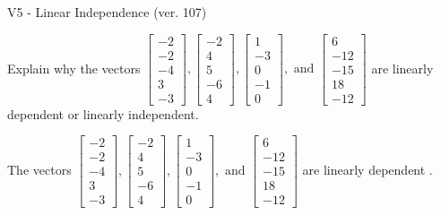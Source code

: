 \begin{exercise}
  \begin{exerciseTitle}V5 - Linear Independence (ver. 107)\end{exerciseTitle}
  \begin{exerciseStatement}
    Explain why the vectors \(\left[\begin{array}{r}
-2 \\
-2 \\
-4 \\
3 \\
-3
\end{array}\right] , \left[\begin{array}{r}
-2 \\
4 \\
5 \\
-6 \\
4
\end{array}\right] , \left[\begin{array}{r}
1 \\
-3 \\
0 \\
-1 \\
0
\end{array}\right] , \text{ and } \left[\begin{array}{r}
6 \\
-12 \\
-15 \\
18 \\
-12
\end{array}\right]\) are linearly dependent or linearly independent.	


  \end{exerciseStatement}
  \begin{exerciseAnswer}
   The vectors \(\left[\begin{array}{r}
-2 \\
-2 \\
-4 \\
3 \\
-3
\end{array}\right] , \left[\begin{array}{r}
-2 \\
4 \\
5 \\
-6 \\
4
\end{array}\right] , \left[\begin{array}{r}
1 \\
-3 \\
0 \\
-1 \\
0
\end{array}\right] , \text{ and } \left[\begin{array}{r}
6 \\
-12 \\
-15 \\
18 \\
-12
\end{array}\right]\) are 
  	 linearly dependent  .
  


  \end{exerciseAnswer}
\end{exercise}